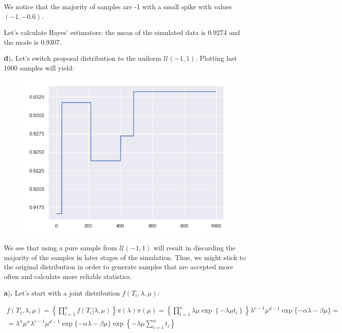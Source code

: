 \documentclass[a4 paper]{article}
\begin{document}
We notice that the majority of samples
are -1 with a small spike with values $(-1,-0.6)$.

Let's calculate Bayes' estimators: the mean 
of the simulated data is 0.9274
and the mode is 0.9307.


\textbf{d$)$.} Let's switch 
proposal distribution to the uniform 
$\mathcal{U}(-1,1)$. Plotting last 1000 samples will yield:

\begin{figure}[H]
	\includegraphics[scale=0.4]{q1c}
	\centering
	\label{q1c}
\end{figure}

We see that using a pure sample from 
$\mathcal{U}(-1,1)$ will result in
discarding the majority of the samples 
in later stages of the simulation. Thus,
we might stick to the original distribution 
in order to generate 
samples that are accepted more often and
calculate more reliable statistics.





\textbf{a$)$.} Let's start with a
joint distribution $f(T_{i},\lambda,\mu)$:


\begin{align*}
f(T_{i},\lambda,\mu)	=\left\{ \prod_{i=1}^{n}f\left(T_{i}|\lambda,\mu\right)\right\} \pi(\lambda)\pi(\mu)= 	\left\{ \prod_{i=1}^{n}\lambda\mu\exp\left\{ -\lambda\mu t_{i}\right\} \right\} \lambda^{c-1}\mu^{d-1}\exp\{-\alpha\lambda-\beta\mu\}= \\
=	\lambda^{n}\mu^{n}\lambda^{c-1}\mu^{d-1}\exp\{-\alpha\lambda-\beta\mu\}\exp\left\{ -\lambda\mu\sum_{i=1}^{n}t_{i}\right\} 
\end{align*}
\end{document}
